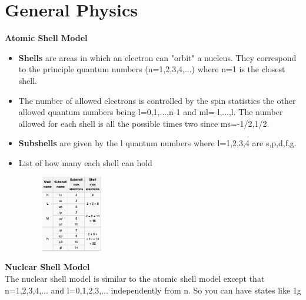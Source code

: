 \documentclass[12pt]{extarticle}
\begin{document}
\section*{General Physics}
\textbf{Atomic Shell Model}
\begin{itemize}
   \item \textbf{Shells} are areas in which an electron can "orbit" a nucleus. They correspond to the principle quantum numbers (n=1,2,3,4,...) where n=1 is the closest shell.
   \item The number of allowed electrons is controlled by the spin statistics the other allowed quantum numbers being l=0,1,...,n-1 and ml=-l,...,l. The number allowed for each shell is all the possible times two since ms=-1/2,1/2.
   \item \textbf{Subshells} are given by the l quantum numbers where l=1,2,3,4 are s,p,d,f,g.
   \item List of how many each shell can hold
   \begin{figure}[h!]
      \includegraphics[width=0.25\textwidth]{shell.png}
   \end{figure}
\end{itemize}
\textbf{Nuclear Shell Model} \\
The nuclear shell model is similar to the atomic shell model except that n=1,2,3,4,... and l=0,1,2,3,... independently from n. So you can have states like 1g
\end{document}
